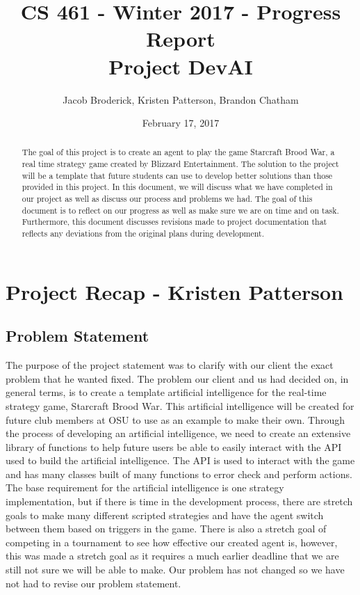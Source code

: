 \documentclass[10pt,letterpaper,onecolumn,draftclsnofoot]{IEEEtran}
\begin{document}
	
	\begin{titlepage}
		
		\title{CS 461 - Winter 2017 - Progress Report \\ Project DevAI}
		\author{Jacob Broderick, Kristen Patterson, Brandon Chatham}
		\date{February 17, 2017}
		\maketitle
		\vspace{4cm}
		\begin{abstract}
			\noindent 
			\noindent
			The goal of this project is to create an agent to play the game Starcraft Brood War, a real time strategy game created by Blizzard Entertainment. The solution to the project will be a template that future students can use to develop better solutions than those provided in this project. In this document, we will discuss what we have completed in our project as well as discuss our process and problems we had. The goal of this document is to reflect on our progress as well as make sure we are on time and on task. Furthermore, this document discusses revisions made to project documentation that reflects any deviations from the original plans during development.
		\end{abstract}
	\end{titlepage}

	\section{Project Recap - Kristen Patterson}

	\subsection{Problem Statement}
	The purpose of the project statement was to clarify with our client the exact problem that he wanted fixed. The problem our client and us had decided on, in general terms, is to create a template artificial intelligence for the real-time strategy game, Starcraft Brood War. This artificial intelligence will be created for future club members at OSU to use as an example to make their own. Through the process of developing an artificial intelligence, we need to create an extensive library of functions to help future users be able to easily interact with the API used to build the artificial intelligence. The API is used to interact with the game and has many classes built of many functions to error check and perform actions. The base requirement for the artificial intelligence is one strategy implementation, but if there is time in the development process, there are stretch goals to make many different scripted strategies and have the agent switch between them based on triggers in the game. There is also a stretch goal of competing in a tournament to see how effective our created agent is, however, this was made a stretch goal as it requires a much earlier deadline that we are still not sure we will be able to make. Our problem has not changed so we have not had to revise our problem statement.
\end{document}
